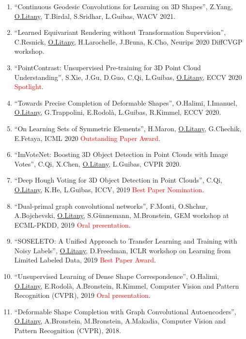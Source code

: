 \begin{enumerate}
\item ``Continuous Geodesic Convolutions for Learning on 3D Shapes'', Z.Yang, \underline{O.Litany}, T.Birdal, S.Sridhar, L.Guibas, WACV 2021.

\item ``Learned Equivariant Rendering without Transformation Supervision'', C.Resnick, \underline{O.Litany}, H.Larochelle, J.Bruna, K.Cho, Neurips 2020 DiffCVGP workshop.

\item ``PointContrast: Unsupervised Pre-training for 3D Point Cloud Understanding'', S.Xie, J.Gu, D.Guo, C.Qi, L.Guibas, \underline{O.Litany}, ECCV 2020 \textcolor{red}{Spotlight}.

\item ``Towards Precise Completion of Deformable Shapes'', O.Halimi, I.Imanuel, \underline{O.Litany}, G.Trappolini, E.Rodol{\`a}, L.Guibas, R.Kimmel, ECCV 2020.

\item ``On Learning Sets of Symmetric Elements'', H.Maron, \underline{O.Litany}, G.Chechik, E.Fetaya, ICML 2020 \textcolor{red}{Outstanding Paper Award}.

\item ``ImVoteNet: Boosting 3D Object Detection in Point Clouds with Image Votes'', C.Qi, X.Chen, \underline{O.Litany}, L.Guibas, CVPR 2020.

\item ``Deep Hough Voting for 3D Object Detection in Point Clouds'', C.Qi, \underline{O.Litany}, K.He, L.Guibas, ICCV, 2019 \textcolor{red}{Best Paper Nomination}.

\item ``Dual-primal graph convolutional networks'', F.Monti, O.Shchur, A.Bojchevski, \underline{O.Litany}, S.G{\"u}nnemann, M.Bronstein, GEM workshop at ECML-PKDD, 2019 \textcolor{red}{Oral presentation}.

\item ``SOSELETO: A Unified Approach to Transfer Learning and Training with Noisy Labels'', \underline{O.Litany}, D.Freedman, ICLR workshop on Learning from Limited Labeled Data, 2019 \textcolor{red}{Best Paper Award}.

\item ``Unsupervised Learning of Dense Shape Correspondence'', O.Halimi, \underline{O.Litany}, E.Rodol{\`a}, A.Bronstein, R.Kimmel, Computer Vision and Pattern Recognition (CVPR), 2019 \textcolor{red}{Oral presentation}.

\item ``Deformable Shape Completion with Graph Convolutional Autoencoders'', \underline{O.Litany}, A.Bronstein, M.Bronstein, A.Makadia, Computer Vision and Pattern Recognition (CVPR), 2018.


\end{enumerate}
